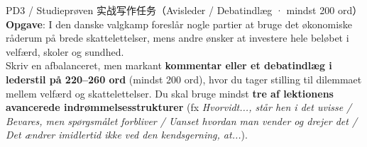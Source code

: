\begin{emailbox}{PD3 / Studieprøven 实战写作任务（Avisleder / Debatindlæg · mindst 200 ord）}
\textbf{Opgave}: I den danske valgkamp foreslår nogle partier at bruge det økonomiske råderum på brede skattelettelser, mens andre ønsker at investere hele beløbet i velfærd, skoler og sundhed.\\[3pt]
Skriv en afbalanceret, men markant \textbf{kommentar eller et debatindlæg i lederstil på 220--260 ord} (mindst 200 ord), hvor du tager stilling til dilemmaet mellem velfærd og skattelettelser. Du skal bruge mindst \textbf{tre af lektionens avancerede indrømmelsesstrukturer} (fx \textit{Hvorvidt..., står hen i det uvisse / Bevares, men spørgsmålet forbliver / Uanset hvordan man vender og drejer det / Det ændrer imidlertid ikke ved den kendsgerning, at...}).
\end{emailbox}

